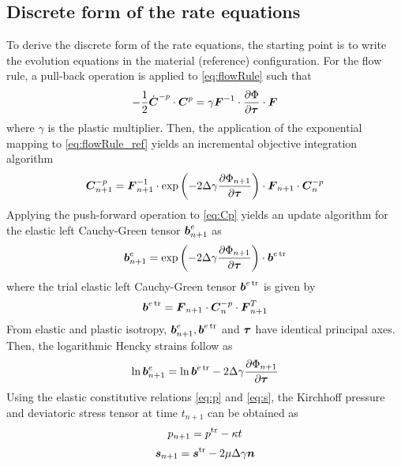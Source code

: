\documentclass[11pt]{article}
\theoremstyle{remark}
\begin{document}
\subsection{Discrete form of the rate equations}
To derive the discrete form of the rate equations, the starting point 
is to write the evolution equations in the material (reference) 
configuration. For the flow rule, a pull-back operation is applied to 
\eqref{eq:flowRule} such that
%
\begin{equation}\label{eq:flowRule_ref}
-\frac{1}{2}\dot{{\boldsymbol{C}}}^{-p}\cdot{\boldsymbol{C}}^p 
= \gamma{\boldsymbol{F}}^{-1} \cdot \frac{\partial\Phi}{\partial{\boldsymbol{\tau}}} \cdot {\boldsymbol{F}}
\end{equation}
%
where $\gamma$ is the plastic multiplier. Then, the application of the 
exponential mapping to \eqref{eq:flowRule_ref} yields an incremental 
objective integration algorithm
%
\begin{equation}\label{eq:Cp}
{\boldsymbol{C}}_{n+1}^{-p} = {\boldsymbol{F}}_{n+1}^{-1} \cdot \exp\left( -2\Delta\gamma
\frac{\partial\Phi_{n+1}}{\partial{\boldsymbol{\tau}}}\right) \cdot {\boldsymbol{F}}_{n+1} 
\cdot {\boldsymbol{C}}_{n}^{-p}
\end{equation}
%
Applying the push-forward operation to \eqref{eq:Cp} yields an update
algorithm for the elastic left Cauchy-Green tensor ${\boldsymbol{b}}_{n+1}^e$ as
%
\begin{equation}\label{eq:be_n}
{\boldsymbol{b}}_{n+1}^e = \exp\left( -2\Delta\gamma\frac{\partial\Phi_{n+1}}
{\partial{\boldsymbol{\tau}}}\right)\cdot{\boldsymbol{b}}^{e\operatorname{\text{tr}}}
\end{equation}
%
where the trial elastic left Cauchy-Green tensor ${\boldsymbol{b}}^{e\operatorname{\text{tr}}}$ is given 
by
%
\begin{equation}\label{eq:betr}
{\boldsymbol{b}}^{e\operatorname{\text{tr}}} = {\boldsymbol{F}}_{n+1}\cdot{\boldsymbol{C}}_{n}^{-p}\cdot{\boldsymbol{F}}^T_{n+1}
\end{equation}
%
From elastic and plastic isotropy, ${\boldsymbol{b}}_{n+1}^e, {\boldsymbol{b}}^{e\operatorname{\text{tr}}}$ and 
${\boldsymbol{\tau}}$ have identical principal axes. Then, the logarithmic Hencky
strains follow as
%
\begin{equation}\label{eq:lnbetr}
\ln{\boldsymbol{b}}_{n+1}^e = \ln{\boldsymbol{b}}^{e\operatorname{\text{tr}}} - 
2\Delta\gamma\frac{\partial\Phi_{n+1}}{\partial{\boldsymbol{\tau}}}
\end{equation}
%
Using the elastic constitutive relations \eqref{eq:p} and 
\eqref{eq:s}, the Kirchhoff pressure and deviatoric stress tensor at 
time $t_{n+1}$ can be obtained as
%
\begin{equation}\label{eq:discrete_p}
p_{n+1} = p^{\operatorname{\text{tr}}} - \kappa t
\end{equation}
%
\begin{equation}\label{eq:discrete_s}
{\boldsymbol{s}}_{n+1} = {\boldsymbol{s}}^{\operatorname{\text{tr}}} - 2\mu\Delta\gamma {\boldsymbol{n}}
\end{equation}
\end{document}
